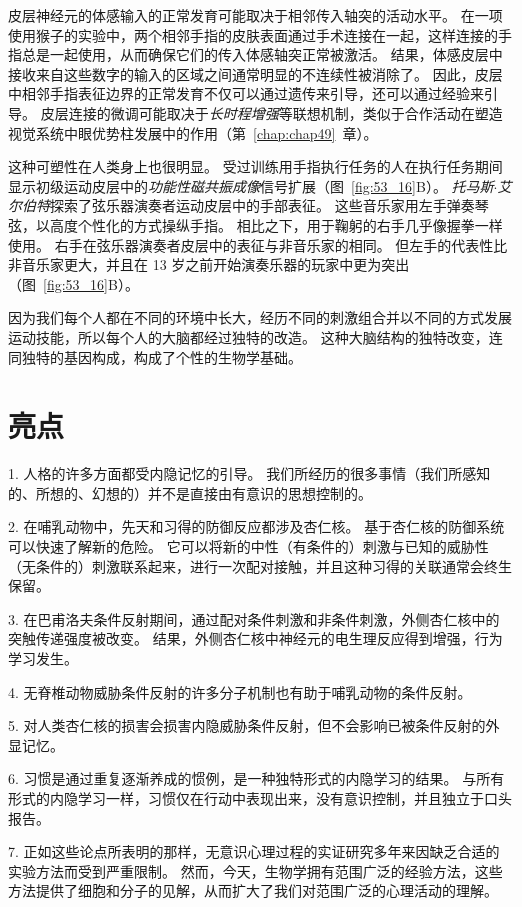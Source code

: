 皮层神经元的体感输入的正常发育可能取决于相邻传入轴突的活动水平。
在一项使用猴子的实验中，两个相邻手指的皮肤表面通过手术连接在一起，这样连接的手指总是一起使用，从而确保它们的传入体感轴突正常被激活。
结果，体感皮层中接收来自这些数字的输入的区域之间通常明显的不连续性被消除了。
因此，皮层中相邻手指表征边界的正常发育不仅可以通过遗传来引导，还可以通过经验来引导。
皮层连接的微调可能取决于\textit{长时程增强}等联想机制，类似于合作活动在塑造视觉系统中眼优势柱发展中的作用（第~\ref{chap:chap49}~章）。


这种可塑性在人类身上也很明显。
受过训练用手指执行任务的人在执行任务期间显示初级运动皮层中的\textit{功能性磁共振成像}信号扩展（图~\ref{fig:53_16}B）。
\textit{托马斯$\cdot$艾尔伯特}探索了弦乐器演奏者运动皮层中的手部表征。
这些音乐家用左手弹奏琴弦，以高度个性化的方式操纵手指。
相比之下，用于鞠躬的右手几乎像握拳一样使用。
右手在弦乐器演奏者皮层中的表征与非音乐家的相同。
但左手的代表性比非音乐家更大，并且在 13 岁之前开始演奏乐器的玩家中更为突出（图~\ref{fig:53_16}B）。


因为我们每个人都在不同的环境中长大，经历不同的刺激组合并以不同的方式发展运动技能，所以每个人的大脑都经过独特的改造。
这种大脑结构的独特改变，连同独特的基因构成，构成了个性的生物学基础。



\section{亮点}

1. 人格的许多方面都受内隐记忆的引导。
我们所经历的很多事情（我们所感知的、所想的、幻想的）并不是直接由有意识的思想控制的。


2. 在哺乳动物中，先天和习得的防御反应都涉及杏仁核。
基于杏仁核的防御系统可以快速了解新的危险。
它可以将新的中性（有条件的）刺激与已知的威胁性（无条件的）刺激联系起来，进行一次配对接触，并且这种习得的关联通常会终生保留。


3. 在巴甫洛夫条件反射期间，通过配对条件刺激和非条件刺激，外侧杏仁核中的突触传递强度被改变。
结果，外侧杏仁核中神经元的电生理反应得到增强，行为学习发生。


4. 无脊椎动物威胁条件反射的许多分子机制也有助于哺乳动物的条件反射。


5. 对人类杏仁核的损害会损害内隐威胁条件反射，但不会影响已被条件反射的外显记忆。


6. 习惯是通过重复逐渐养成的惯例，是一种独特形式的内隐学习的结果。
与所有形式的内隐学习一样，习惯仅在行动中表现出来，没有意识控制，并且独立于口头报告。


7. 正如这些论点所表明的那样，无意识心理过程的实证研究多年来因缺乏合适的实验方法而受到严重限制。
然而，今天，生物学拥有范围广泛的经验方法，这些方法提供了细胞和分子的见解，从而扩大了我们对范围广泛的心理活动的理解。


